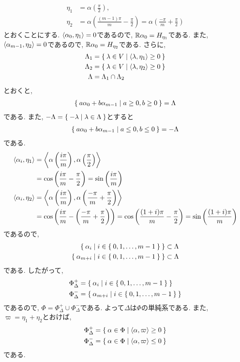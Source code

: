\begin{align*}
  \eta_1&=\alpha\left(\frac{\pi}{2}\right),\\
  \eta_2&=\alpha\left(\frac{(m-1)\pi}{m}-\frac{\pi}{2}\right)
  =\alpha\left(\frac{-\pi}{m}+\frac{\pi}{2}\right)
\end{align*}
とおくことにする.
$\Braket{\alpha_0, \eta_1} = 0$であるので, $\mathbb{R}\alpha_0=H_{\eta_1}$である.
また, 
$\Braket{\alpha_{m-1}, \eta_2} = 0$であるので, $\mathbb{R}\alpha_0=H_{\eta_2}$である.
さらに,
\begin{align*}
 \Lambda_1&= \Set{\lambda\in V|\Braket{\lambda,\eta_1}\geq 0}\\
 \Lambda_2&= \Set{\lambda\in V|\Braket{\lambda,\eta_2}\geq 0}\\
 \Lambda&=\Lambda_1\cap \Lambda_2
\end{align*}
とおくと,
\begin{align*}
  \Set{a\alpha_0+b\alpha_{m-1}|a\geq 0,b\geq 0}=\Lambda
\end{align*}
である. また, $-\Lambda=\Set{-\lambda|\lambda\in\Lambda}$とすると
\begin{align*}
  \Set{a\alpha_0+b\alpha_{m-1}|a\leq 0,b\leq 0}=-\Lambda
\end{align*}
である.
\begin{align*}
  \Braket{\alpha_i,\eta_1}&=\Braket{\alpha\left(\frac{i\pi}{m}\right),\alpha\left(\frac{\pi}{2}\right)}\\
  &=\cos\left(\frac{i\pi}{m}-\frac{\pi}{2}\right)=\sin\left(\frac{i\pi}{m}\right)\\
\Braket{\alpha_i,\eta_2}&=\Braket{\alpha\left(\frac{i\pi}{m}\right),\alpha\left(\frac{-\pi}{m}+\frac{\pi}{2}\right)}\\
&=\cos\left(\frac{i\pi}{m}-\left(\frac{-\pi}{m}+\frac{\pi}{2}\right)\right)
=\cos\left(\frac{(1+i)\pi}{m}-\frac{\pi}{2}\right)
=\sin\left(\frac{(1+i)\pi}{m}\right)
\end{align*}
であるので,
\begin{align*}
\Set{\alpha_{i}|i\in\Set{0,1,\ldots,m-1}}\subset\Lambda\\
\Set{\alpha_{m+i}|i\in\Set{0,1,\ldots,m-1}}\subset\Lambda
\end{align*}
である.  したがって,
\begin{align*}
\Phi_\Delta^+&=\Set{\alpha_{i}|i\in\Set{0,1,\ldots,m-1}}\\
\Phi_\Delta^-&=\Set{\alpha_{m+i}|i\in\Set{0,1,\ldots,m-1}}
\end{align*}
であるので, $\Phi=\Phi_\Delta^+\cup\Phi_\Delta^-$である.
よって$\Delta$は$\Phi$の単純系である.
また,
$\varpi=\eta_1+\eta_2$とおけば,
\begin{align*}
\Phi_\Delta^+&=\Set{\alpha\in\Phi|\Braket{\alpha,\varpi}\geq 0}\\
\Phi_\Delta^-&=\Set{\alpha\in\Phi|\Braket{\alpha,\varpi}\leq 0}
\end{align*}
である.
